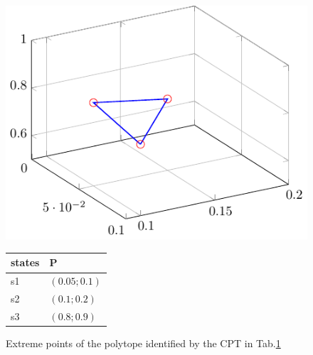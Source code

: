 \begin{figure}[H] 
    \centering
    \begin{minipage}{0.5\textwidth} 
        \centering
        \includegraphics[width=\linewidth]{imgs/pdfs/7_polytope.pdf}
        \caption{Extreme points of the polytope identified by the CPT in Tab.\ref{3_cpt_extremepoints}}\label{3_extreme_points}
    \end{minipage}
    \hfill
    \begin{minipage}{0.4\textwidth}
        \centering
        \begin{tabular}{P{1cm}P{1.5cm}}
            \toprule
            \textbf{states} & \textbf{P} \\
            \midrule
            s1 & $(0.05;0.1)$ \\
            s2 & $(0.1;0.2)$ \\
            s3 & $(0.8;0.9)$ \\
          \end{tabular}
        \label{3_cpt_extremepoints}
    \end{minipage}
\end{figure}

